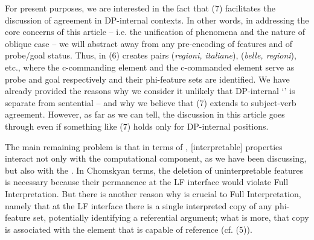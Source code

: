 \documentclass[output=paper]{langsci/langscibook}
\begin{document}
For present purposes, we are interested in the fact that (7) facilitates the discussion of agreement in DP-internal contexts. In other words, in addressing the core concerns of this article – i.e. the unification of  phenomena and the nature of oblique case – we will abstract away from any pre-encoding of features and of probe\slash goal status. Thus, in (6)  creates pairs (\textit{regioni, italiane}), (\textit{belle, regioni}), etc., where the c-commanding element and the c-commanded element serve as probe and goal respectively and their phi-feature sets are identified. We have already provided the reasons why we consider it unlikely that DP-internal ‘’ is separate from sentential  – and why we believe that (7) extends to subject-verb agreement. However, as far as we can tell, the discussion in this article goes through even if something like (7) holds only for DP-internal positions. 

The main remaining problem is that in terms of \citet{Chomsky2000,Chomsky2001Derivation}, [interpretable] properties interact not only with the computational component, as we have been discussing, but also with the . In Chomskyan terms, the deletion of uninterpretable features is necessary because their permanence at the LF interface would violate Full Interpretation. But there is another reason why  is crucial to Full Interpretation, namely {that at the LF interface there is a single interpreted copy of any phi-feature set, potentially identifying a referential argument; what is more, that copy is associated with the element that is capable of reference (cf. (5)).}
\end{document}
